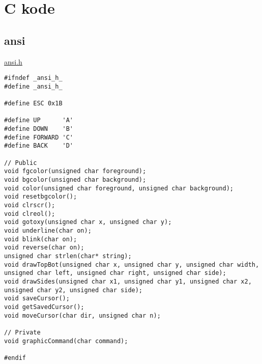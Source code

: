 \chapter{C kode}

\section{ansi}
\label{ansi}

\underline{ansi.h}
\begin{lstlisting}
#ifndef _ansi_h_
#define _ansi_h_

#define ESC 0x1B

#define UP		'A'
#define DOWN	'B'
#define FORWARD	'C'
#define BACK	'D'

// Public
void fgcolor(unsigned char foreground);
void bgcolor(unsigned char background);
void color(unsigned char foreground, unsigned char background);
void resetbgcolor();
void clrscr();
void clreol();
void gotoxy(unsigned char x, unsigned char y);
void underline(char on);
void blink(char on);
void reverse(char on);
unsigned char strlen(char* string);
void drawTopBot(unsigned char x, unsigned char y, unsigned char width, unsigned char left, unsigned char right, unsigned char side);
void drawSides(unsigned char x1, unsigned char y1, unsigned char x2, unsigned char y2, unsigned char side);
void saveCursor();
void getSavedCursor();
void moveCursor(char dir, unsigned char n);

// Private
void graphicCommand(char command);

#endif
\end{lstlisting}

